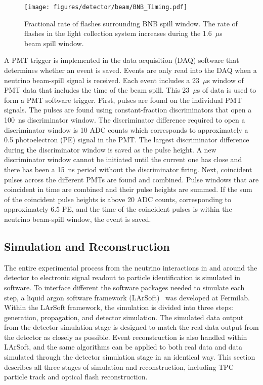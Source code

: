     \begin{figure}[h]
      \centering
      \texttt{[image: figures/detector/beam/BNB\_Timing.pdf]}
      \caption{Fractional rate of flashes surrounding BNB spill window. The
      rate of flashes in the light collection system increases during the
      1.6~$\mu$s beam spill window.}
      \label{fig:bnbtiming}
    \end{figure}

    A PMT trigger is implemented in the data acquisition (DAQ) software that
    determines whether an event is saved. Events are only read into the DAQ
    when a neutrino beam-spill signal is received. Each event includes a
    23~$\mu$s window of PMT data that includes the time of the beam spill.
    This 23~$\mu$s of data is used to form a PMT software trigger. First,
    pulses are found on the individual PMT signals. The pulses are found using
    constant-fraction discriminators that open a 100~ns discriminator window.
    The discriminator difference required to open a discriminator window is 10
    ADC counts which corresponds to approximately a 0.5 photoelectron (PE)
    signal in the PMT. The largest discriminator difference during the
    discriminator window is saved as the pulse height. A new discriminator
    window cannot be initiated until the current one has close and there has
    been a 15~ns period without the discriminator firing.  Next, coincident
    pulses across the different PMTs are found and combined.  Pulse windows
    that are coincident in time are combined and their pulse heights are
    summed. If the sum of the coincident pulse heights is above 20 ADC counts,
    corresponding to approximately 6.5 PE, and the time of the coincident
    pulses is within the neutrino beam-spill window, the event is saved.


\subsection{Simulation and Reconstruction}\label{sec:simreco}
  The entire experimental process from the neutrino interactions in and around
  the detector to electronic signal readout to particle identification is
  simulated in software. To interface different the software packages needed to
  simulate each step, a liquid argon software framework (LArSoft)~\cite{larsoft}
  was developed at Fermilab. Within the LArSoft framework, the simulation is
  divided into three steps: generation, propagation, and detector simulation.
  The simulated data output from the detector simulation stage is designed to
  match the real data output from the detector as closely as possible. Event
  reconstruction is also handled within LArSoft, and the same algorithms can be
  applied to both real data and data simulated through the detector simulation
  stage in an identical way. This section describes all three stages of
  simulation and reconstruction, including TPC particle track and optical flash
  reconstruction.

